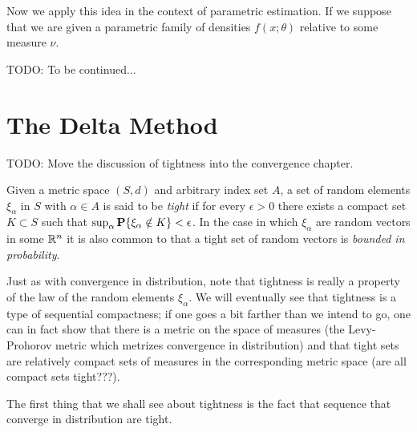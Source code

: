 Now we apply this idea in the context of parametric estimation.  If we
suppose that we are given a parametric family of densities $f(x;
\theta)$ relative to some measure $\nu$.

TODO: To be continued...

\section{The Delta Method}

TODO: Move the discussion of tightness into the convergence chapter.

\begin{defn}Given a metric space $(S,d)$ and arbitrary index set $A$, a set of random elements
  $\xi_\alpha$ in $S$ with $\alpha \in A$ is said to be \emph{tight} if for
  every $\epsilon > 0$ there exists a compact set $K \subset S$ such
  that $\sup_\alpha \textbf{P}\{\xi_\alpha \notin K\} < \epsilon$.  In
  the case in which $\xi_\alpha$ are random vectors in some $\mathbb{R}^n$
  it is also common to that a tight set of random vectors is
  \emph{bounded in probability}.
\end{defn}

Just as with convergence in distribution, note that tightness is
really a property of the law of the random elements $\xi_\alpha$.  
We will eventually see that tightness is a type of sequential
compactness; if one goes a bit farther than we intend to go, one can in
fact show that there is a metric on the space of measures (the
Levy-Prohorov metric which metrizes convergence in distribution) and
that tight sets are relatively compact sets of
measures in the corresponding metric space (are all compact sets tight???).

The first thing that we shall see about tightness is the fact that
sequence that converge in distribution are tight.

